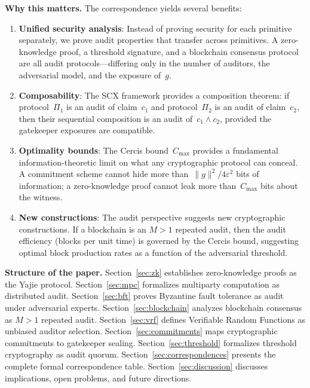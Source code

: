 \documentclass[12pt,a4paper]{article}
\theoremstyle{remark}
\newcommand{\SCX}{\textsf{SCX}}
\newcommand{\Yajie}{\textsf{Yajie}}
\newcommand{\Cercis}{\textsf{Cercis}}
\begin{document}
\medskip
\noindent\textbf{Why this matters.}
The correspondence yields several benefits:
\begin{enumerate}[leftmargin=*, label=(\arabic*)]
  \item \textbf{Unified security analysis}: Instead of proving security for each primitive separately, we prove audit properties that transfer across primitives. A zero-knowledge proof, a threshold signature, and a blockchain consensus protocol are all audit protocols---differing only in the number of auditors, the adversarial model, and the exposure of~$g$.
  \item \textbf{Composability}: The \SCX{} framework provides a composition theorem: if protocol~$\Pi_1$ is an audit of claim~$c_1$ and protocol~$\Pi_2$ is an audit of claim~$c_2$, then their sequential composition is an audit of~$c_1 \land c_2$, provided the gatekeeper exposures are compatible.
  \item \textbf{Optimality bounds}: The \Cercis{} bound~$C_{\max}$ provides a fundamental information-theoretic limit on what any cryptographic protocol can conceal. A commitment scheme cannot hide more than~$\|g\|^2/4\varepsilon^2$ bits of information; a zero-knowledge proof cannot leak more than~$C_{\max}$ bits about the witness.
  \item \textbf{New constructions}: The audit perspective suggests new cryptographic constructions. If a blockchain is an $M > 1$ repeated audit, then the audit efficiency (blocks per unit time) is governed by the \Cercis{} bound, suggesting optimal block production rates as a function of the adversarial threshold.
\end{enumerate}

\medskip
\noindent\textbf{Structure of the paper.}
Section~\ref{sec:zk} establishes zero-knowledge proofs as the \Yajie{} protocol.
Section~\ref{sec:mpc} formalizes multiparty computation as distributed audit.
Section~\ref{sec:bft} proves Byzantine fault tolerance as audit under adversarial experts.
Section~\ref{sec:blockchain} analyzes blockchain consensus as $M > 1$ repeated audit.
Section~\ref{sec:vrf} defines Verifiable Random Functions as unbiased auditor selection.
Section~\ref{sec:commitments} maps cryptographic commitments to gatekeeper sealing.
Section~\ref{sec:threshold} formalizes threshold cryptography as audit quorum.
Section~\ref{sec:correspondences} presents the complete formal correspondence table.
Section~\ref{sec:discussion} discusses implications, open problems, and future directions.
\end{document}
